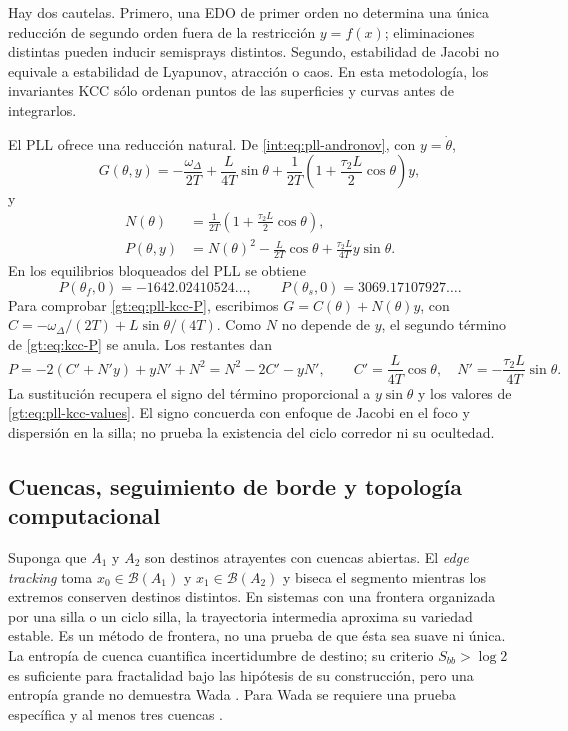 Hay dos cautelas. Primero, una EDO de primer orden no determina una única
reducción de segundo orden fuera de la restricción $y=f(x)$; eliminaciones
distintas pueden inducir semisprays distintos. Segundo, estabilidad de Jacobi
no equivale a estabilidad de Lyapunov, atracción o caos. En esta metodología,
los invariantes KCC sólo ordenan puntos de las superficies y curvas antes de
integrarlos.

El PLL ofrece una reducción natural. De
\cref{int:eq:pll-andronov}, con $y=\dot\theta$,
\begin{equation}
 G(\theta,y)=
 -\frac{\omega_\Delta}{2T}+\frac{L}{4T}\sin\theta
 +\frac{1}{2T}\left(1+\frac{\tau_2L}{2}\cos\theta\right)y,
 \label{gt:eq:pll-kcc-G}
\end{equation}
y
\begin{align}
 N(\theta)&=\frac{1}{2T}
 \left(1+\frac{\tau_2L}{2}\cos\theta\right),\\
 P(\theta,y)&=N(\theta)^2-\frac{L}{2T}\cos\theta
 +\frac{\tau_2L}{4T}y\sin\theta.
 \label{gt:eq:pll-kcc-P}
\end{align}
En los equilibrios bloqueados del PLL se obtiene
\begin{equation}
 P(\theta_f,0)=-1642.02410524\ldots,
 \qquad
 P(\theta_s,0)=3069.17107927\ldots.
 \label{gt:eq:pll-kcc-values}
\end{equation}
Para comprobar \cref{gt:eq:pll-kcc-P}, escribimos
\(G=C(\theta)+N(\theta)y\), con
\(C=-\omega_\Delta/(2T)+L\sin\theta/(4T)\). Como \(N\) no depende de
\(y\), el segundo término de \cref{gt:eq:kcc-P} se anula. Los restantes
dan
\[
 P=-2(C'+N'y)+yN'+N^2=N^2-2C'-yN',
 \qquad C'=\frac{L}{4T}\cos\theta,\quad
 N'=-\frac{\tau_2L}{4T}\sin\theta.
\]
La sustitución recupera el signo del término proporcional a
\(y\sin\theta\) y los valores de \cref{gt:eq:pll-kcc-values}.
El signo concuerda con enfoque de Jacobi en el foco y dispersión en la silla;
no prueba la existencia del ciclo corredor ni su ocultedad.

\ifHAFOBasinMaterial
\subsection{Cuencas, seguimiento de borde y topología computacional}
\label{subsec:gt-set-oriented}

Suponga que $A_1$ y $A_2$ son destinos atrayentes con cuencas abiertas. El
\emph{edge tracking} toma $x_0\in\mathcal B(A_1)$ y
$x_1\in\mathcal B(A_2)$ y biseca el segmento mientras los extremos conserven
destinos distintos. En sistemas con una frontera organizada por una silla o
un ciclo silla, la trayectoria intermedia aproxima su variedad estable. Es un
método de frontera, no una prueba de que ésta sea suave ni única. La entropía
de cuenca cuantifica incertidumbre de destino; su criterio $S_{bb}>\log2$ es
suficiente para fractalidad bajo las hipótesis de su construcción, pero una
entropía grande no demuestra Wada \cite{DazaEtAl2016BasinEntropy}. Para Wada
se requiere una prueba específica y al menos tres cuencas
\cite{DazaEtAl2015Wada}.


